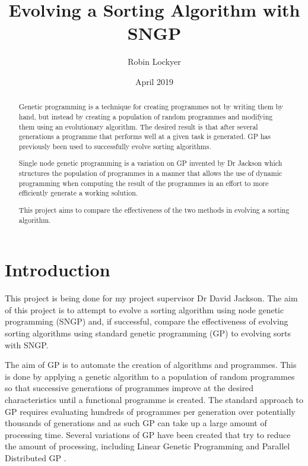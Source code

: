 \documentclass{article}
\title{Evolving a Sorting Algorithm with SNGP}
\author{Robin Lockyer}
\date{April 2019}
\affil{University of Liverpool}
\begin{document}
	
	\maketitle	
	
	\begin{abstract}
		
		Genetic programming is a technique for creating programmes not by writing them by hand, but instead by creating a population of random programmes and modifying them using an evolutionary algorithm. The desired result is that after several generations a programme that performs well at a given task is generated. GP has previously been used to successfully evolve sorting algorithms.
		
		Single node genetic programming is a variation on GP invented by Dr Jackson which structures the population of programmes in a manner that allows the use of dynamic programming when computing the result of the programmes in an effort to more efficiently generate a working solution.
		
		This project aims to compare the effectiveness of the two methods in evolving a sorting algorithm.
		
	\end{abstract}

	\tableofcontents
	
	\section{Introduction}
	
		This project is being done for my project supervisor Dr David Jackson. The aim of this project is to attempt to evolve a sorting algorithm using node genetic programming (SNGP) and, if successful, compare the effectiveness of evolving sorting algorithms using standard genetic programming (GP) to evolving sorts with SNGP.
		
		The aim of GP is to automate the creation of algorithms and programmes. This is done by applying a genetic algorithm to a population of random programmes so that successive generations of programmes improve at the desired characteristics until a functional programme is created.
		The standard approach to GP requires evaluating hundreds of programmes per generation over potentially thousands of generations and as such GP can take up a large amount of processing time. Several variations of GP have been created that try to reduce the amount of processing, including Linear Genetic Programming and Parallel Distributed GP \cite{poli_field_2008}.
		
\end{document}
